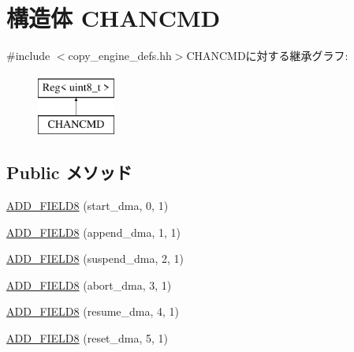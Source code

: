 \hypertarget{structCopyEngineReg_1_1ChanRegs_1_1CHANCMD}{
\section{構造体 CHANCMD}
\label{structCopyEngineReg_1_1ChanRegs_1_1CHANCMD}
}


{\ttfamily \#include $<$copy\_\-engine\_\-defs.hh$>$}CHANCMDに対する継承グラフ:\begin{figure}[H]
\begin{center}
\leavevmode
\includegraphics[height=2cm]{structCopyEngineReg_1_1ChanRegs_1_1CHANCMD}
\end{center}
\end{figure}
\subsection*{Public メソッド}
\begin{DoxyCompactItemize}
\item 
\hyperlink{structCopyEngineReg_1_1ChanRegs_1_1CHANCMD_a91baf06d9b239b49a3868cb51f339ca4}{ADD\_\-FIELD8} (start\_\-dma, 0, 1)
\item 
\hyperlink{structCopyEngineReg_1_1ChanRegs_1_1CHANCMD_a2f027d79a74d8b90182205fff5f5294c}{ADD\_\-FIELD8} (append\_\-dma, 1, 1)
\item 
\hyperlink{structCopyEngineReg_1_1ChanRegs_1_1CHANCMD_a2c79593c6a793d5c6dd3108f189537ec}{ADD\_\-FIELD8} (suspend\_\-dma, 2, 1)
\item 
\hyperlink{structCopyEngineReg_1_1ChanRegs_1_1CHANCMD_a7608a8152daeccc14a9c5e1705d34996}{ADD\_\-FIELD8} (abort\_\-dma, 3, 1)
\item 
\hyperlink{structCopyEngineReg_1_1ChanRegs_1_1CHANCMD_aed8b44e4b1bd43d4c579364db6d574ae}{ADD\_\-FIELD8} (resume\_\-dma, 4, 1)
\item 
\hyperlink{structCopyEngineReg_1_1ChanRegs_1_1CHANCMD_a201dc6d91436359cbd26ea852656bcea}{ADD\_\-FIELD8} (reset\_\-dma, 5, 1)
\end{DoxyCompactItemize}


